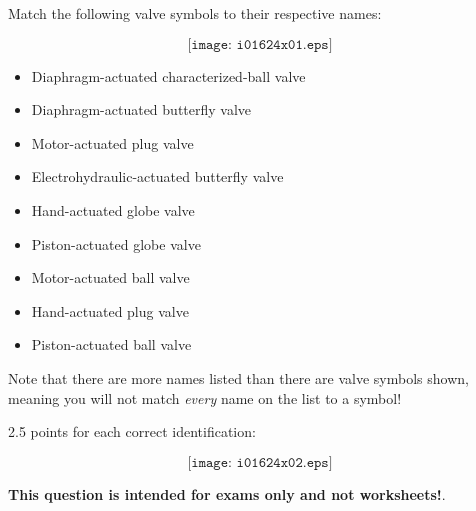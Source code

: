 

Match the following valve symbols to their respective names:

$$\texttt{[image: i01624x01.eps]}$$

\begin{itemize}
\item{} Diaphragm-actuated characterized-ball valve
\item{} Diaphragm-actuated butterfly valve
\item{} Motor-actuated plug valve
\item{} Electrohydraulic-actuated butterfly valve
\item{} Hand-actuated globe valve
\item{} Piston-actuated globe valve
\item{} Motor-actuated ball valve
\item{} Hand-actuated plug valve
\item{} Piston-actuated ball valve
\end{itemize}

Note that there are more names listed than there are valve symbols shown, meaning you will not match {\it every} name on the list to a symbol!







2.5 points for each correct identification:

$$\texttt{[image: i01624x02.eps]}$$







{\bf This question is intended for exams only and not worksheets!}.



